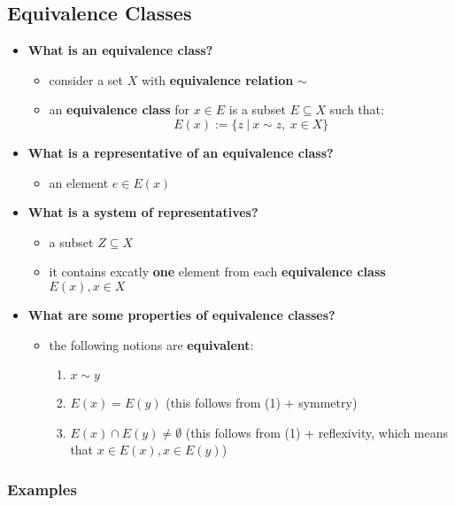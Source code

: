 \documentclass{exam}
\begin{document}
\subsection{Equivalence Classes}

\begin{itemize}
    \item \textbf{What is an equivalence class?}
    \begin{itemize}
        \item consider a set $X$ with \textbf{equivalence relation} $\sim$
        \item an \textbf{equivalence class} for $x \in E$ is a subset $E \subseteq X$ such that:
        \[
        E(x) := \{z \ | \ x \sim z, \ x \in X\}
        \]
    \end{itemize}
    \item \textbf{What is a representative of an equivalence class?}
    \begin{itemize}
        \item an element $e \in E(x)$
    \end{itemize}
    \item \textbf{What is a system of representatives?}
    \begin{itemize}
        \item a subset $Z \subseteq X$
        \item it contains excatly \textbf{one} element from each \textbf{equivalence class} $E(x), x \in X$
    \end{itemize}
    \item \textbf{What are some properties of equivalence classes?}
    \begin{itemize}
        \item the following notions are \textbf{equivalent}:
        \begin{enumerate}
            \item $x \sim y$
            \item $E(x) = E(y)$ (this follows from (1) + symmetry)
            \item $E(x) \cap E(y) \neq \emptyset$ (this follows from (1) + reflexivity, which means that $x \in E(x), x \in E(y)$)
        \end{enumerate}
    \end{itemize}
\end{itemize}

\subsubsection{Examples}
\end{document}
